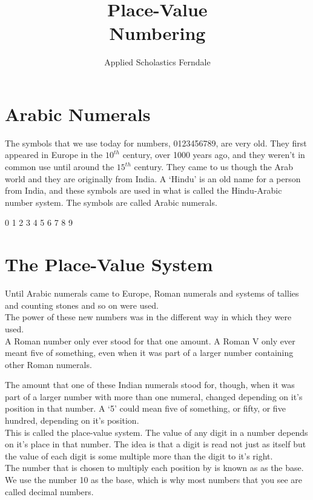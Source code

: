 \documentclass{article}
\title{Place-Value\\Numbering}
\author{Applied Scholastics Ferndale}
\date{}
\begin{document}
\section*{Arabic Numerals}
The symbols that we use today for numbers, 0123456789, are very old. They first appeared in Europe in the $10^{th}$ century, over 1000 years ago, and they weren't in common use until around the $15^{th}$ century. They came to us though the Arab world and they are originally from India.  A ‘Hindu’ is an old name for a person from India, and these symbols are used in what is called the Hindu-Arabic number system. The symbols are called Arabic numerals.\\

\begin{center}
{\Huge 0 1 2 3 4 5 6 7 8 9}
\end{center}

\section*{The Place-Value System}
Until Arabic numerals came to Europe, Roman numerals and systems of tallies and counting stones and so on were used.\\

The power of these new numbers was in the different way in which they were used.\\

A Roman number only ever stood for that one amount. A Roman V only ever meant five of something, even when it was part of a larger number containing other Roman numerals.\\

\newpage

The amount that one of these Indian numerals stood for, though, when it was part of a larger number with more than one numeral, changed depending on it’s position in that number. A ‘5’ could mean five of something, or fifty, or five hundred, depending on it’s position.\\

This is called the place-value system. The value of any digit in a number depends on it’s place in that number. The idea is that a digit is read not just as itself but the value of each digit is some multiple more than the digit to it’s right.\\

The number that is chosen to multiply each position by is known as as the base. We use the number 10 as the base, which is why most numbers that you see are called decimal numbers.\\
\end{document}
